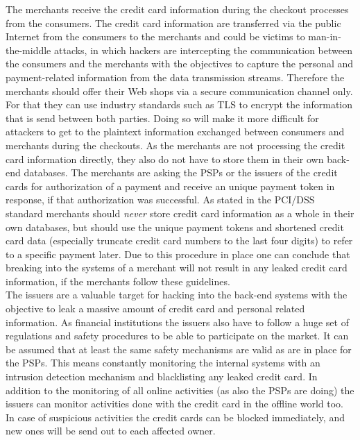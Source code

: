 The merchants receive the credit card information during the checkout processes from the consumers. The credit card information are transferred via the public Internet from the consumers to the merchants and could be victims to man-in-the-middle attacks, in which hackers are intercepting the communication between the consumers and the merchants with the objectives to capture the personal and payment-related information from the data transmission streams. Therefore the merchants should offer their Web shops via a secure communication channel only. For that they can use industry standards such as \gls{TLS} to encrypt the information that is send between both parties. Doing so will make it more difficult for attackers to get to the plaintext information exchanged between consumers and merchants during the checkouts. As the merchants are not processing the credit card information directly, they also do not have to store them in their own back-end databases. The merchants are asking the \gls{PSP}s or the issuers of the credit cards for authorization of a payment and receive an unique payment token in response, if that authorization was successful. As stated in the \gls{PCI/DSS} standard \citep{virtue2009payment} merchants should \emph{never} store credit card information as a whole in their own databases, but should use the unique payment tokens and shortened credit card data (especially truncate credit card numbers to the last four digits) to refer to a specific payment later. Due to this procedure in place one can conclude that breaking into the systems of a merchant will not result in any leaked credit card information, if the merchants follow these guidelines. \\

The issuers are a valuable target for hacking into the back-end systems with the objective to leak a massive amount of credit card and personal related information. As financial institutions the issuers also have to follow a huge set of regulations and safety procedures to be able to participate on the market. It can be assumed that at least the same safety mechanisms are valid as are in place for the \gls{PSP}s. This means constantly monitoring the internal systems with an intrusion detection mechanism and blacklisting any leaked credit card. In addition to the monitoring of all online activities (as also the \gls{PSP}s are doing) the issuers can monitor activities done with the credit card in the offline world too. In case of suspicious activities the credit cards can be blocked immediately, and new ones will be send out to each affected owner. \\

